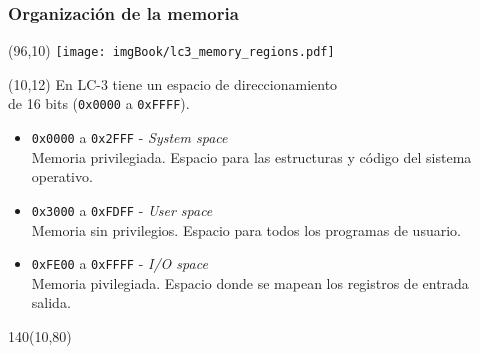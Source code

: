 \documentclass[aspectratio=169]{beamer}
\begin{document}
\begin{frame}[t,fragile]
    \frametitle{Organización de la memoria}
    \begin{textblock}{65}(96,10) \texttt{[image: imgBook/lc3\_memory\_regions.pdf]} \end{textblock}
    \begin{textblock}{80}(10,12)
    En LC-3 tiene un espacio de direccionamiento\\ de 16 bits (\texttt{0x0000} a \texttt{0xFFFF}).\\
    \bigskip
    \begin{itemize}
     \item<2-> \textcolor{naranjauca}{\texttt{0x0000} a \texttt{0x2FFF}} - \emph{System space}\\
     Memoria privilegiada. Espacio para las estructuras y código del sistema operativo.
     \item<3-> \textcolor{naranjauca}{\texttt{0x3000} a \texttt{0xFDFF}} - \emph{User space}\\
     Memoria sin privilegios. Espacio para todos los programas de usuario.
     \item<4-> \textcolor{naranjauca}{\texttt{0xFE00} a \texttt{0xFFFF}} - \emph{I/O space}\\
     Memoria pivilegiada. Espacio donde se mapean los registros de entrada salida.
    \end{itemize}
    \end{textblock}
    \begin{textblock}{140}(10,80)
    \end{textblock}
\end{frame}
\end{document}
